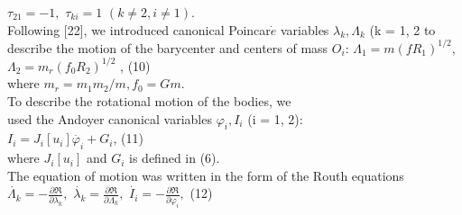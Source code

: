 \documentclass[fontsize = 11pt,a4paper]{article}
\begin{document}
\begin{multicols}{2}
$\tau_{21} = -1,$   $\tau_{ki} = 1$   $(k \neq 2, i \neq 1).$ \\
Following [22], we introduced canonical Poincar$\dot{e}$
variables $\lambda_k, \Lambda_k$ (k = 1, 2 to describe the motion of
the barycenter and centers of mass $O_i$:
$\Lambda_1 = m (fR_1)^{1/2}$,   $\Lambda_2 = m_r (f_0R_2)^{1/2}$ , (10)\\
where $m_r = m_1m_2/m, f_0 = Gm.$\\
To describe the rotational motion of the bodies, we\\
used the Andoyer canonical variables $\varphi_i, I_i $  (i = 1, 2):\\
$I_i = J_i[u_i]\dot{\varphi_i} + G_i$,    (11)\\
where $J_i[u_i]$ and $G_i$ is defined in (6). \\
The equation of motion was written in the form of
the Routh equations \\
$\dot{\Lambda_k} = -  \frac{\partial\Re }{\partial{\lambda_k}},$
$\dot{\lambda_k} = \frac{\partial\Re }{\partial{\Lambda_k}},$
$\dot{I_i} = -  \frac{\partial\Re }{\partial{\varphi_i}},$ (12) \\


\end{multicols}
\end{document}
